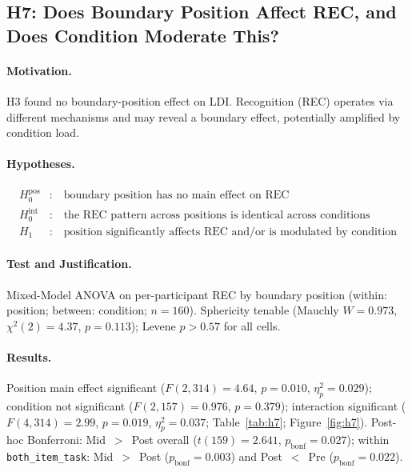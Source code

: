 \documentclass[10pt,a4paper]{article}
\begin{document}
\subsection*{H7: Does Boundary Position Affect REC, and Does Condition Moderate This?}

\paragraph{Motivation.}
H3 found no boundary-position effect on LDI. Recognition (REC) operates via different mechanisms and may reveal a boundary effect, potentially amplified by condition load.

\paragraph{Hypotheses.}
\begin{align*}
  H_0^{\mathrm{pos}} &:\quad \text{boundary position has no main effect on REC} \\
  H_0^{\mathrm{int}} &:\quad \text{the REC pattern across positions is identical across conditions} \\
  H_1 &:\quad \text{position significantly affects REC and/or is modulated by condition}
\end{align*}

\paragraph{Test and Justification.}
Mixed-Model ANOVA on per-participant REC by boundary position (within: position; between: condition; $n{=}160$). Sphericity tenable (Mauchly $W{=}0.973$, $\chi^2(2){=}4.37$, $p{=}0.113$); Levene $p{>}0.57$ for all cells.

\paragraph{Results.}
Position main effect significant ($F(2,314){=}4.64$, $p{=}0.010$, $\eta^2_p{=}0.029$); condition not significant ($F(2,157){=}0.976$, $p{=}0.379$); interaction significant ($F(4,314){=}2.99$, $p{=}0.019$, $\eta^2_p{=}0.037$; Table~\ref{tab:h7}; Figure~\ref{fig:h7}). Post-hoc Bonferroni: Mid~$>$~Post overall ($t(159){=}2.641$, $p_{\mathrm{bonf}}{=}0.027$); within \texttt{both\_item\_task}: Mid~$>$~Post ($p_{\mathrm{bonf}}{=}0.003$) and Post~$<$~Pre ($p_{\mathrm{bonf}}{=}0.022$).
\end{document}
